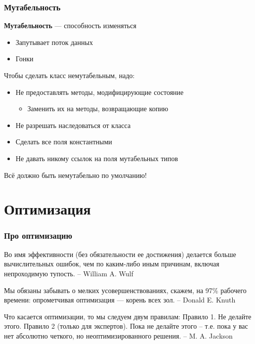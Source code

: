 \documentclass{../../slides-style}
\begin{document}
    \begin{frame}
        \frametitle{Мутабельность}
        \textbf{Мутабельность} --- способность изменяться
        \begin{itemize}
            \item Запутывает поток данных
            \item Гонки
        \end{itemize}
        \vspace{3mm}
        Чтобы сделать класс немутабельным, надо:
        \begin{itemize}
            \item Не предоставлять методы, модифицирующие состояние
            \begin{itemize}
                \item Заменить их на методы, возвращающие копию
            \end{itemize}
            \item Не разрешать наследоваться от класса
            \item Сделать все поля константными
            \item Не давать никому ссылок на поля мутабельных типов
        \end{itemize}
        Всё должно быть немутабельно по умолчанию!
    \end{frame}

    \section{Оптимизация}

    \begin{frame}
        \frametitle{Про оптимизацию}
        Во имя эффективности (без обязательности ее достижения) делается больше вычислительных ошибок, чем по каким-либо иным причинам, включая непроходимую тупость. \newline
        -- William A. Wulf 
    
        \vspace{3mm}
        Мы обязаны забывать о мелких усовершенствованиях, ска­жем, на 97\% рабочего времени: опрометчивая оптимизация --- корень всех зол. \newline
        -- Donald E. Knuth
    
        \vspace{3mm}
        Что касается оптимизации, то мы следуем двум правилам: \newline
        Правило 1. Не делайте этого.  \newline
        Правило 2 (только для экспертов). Пока не делайте этого -- т.е. пока у вас нет абсолютно четкого, но неоптимизированного решения. \newline
        -- M. A. Jackson
    \end{frame}
\end{document}
